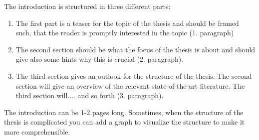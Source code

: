The introduction is structured in three different parts:

\begin{enumerate}
    \item The first part is a teaser for the topic of the thesis and should be framed such, that the reader is promptly interested in the topic (1. paragraph)
    \item The second section should be what the focus of the thesis is about and should give also some hints why this is crucial (2. paragraph).
    \item The third section gives an outlook for the structure of the thesis. The second section will give an overview of the relevant state-of-the-art literature. The third section will.... and so forth (3. paragraph).
\end{enumerate}

The introduction can be 1-2 pages long. 
Sometimes, when the structure of the thesis is complicated you can add a graph to visualize the structure to make it more comprehensible. 



